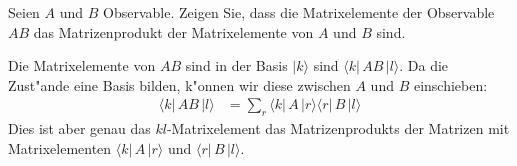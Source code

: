 Seien $A$ und $B$ Observable.
Zeigen Sie, dass die Matrixelemente der Observable $AB$ 
das Matrizenprodukt der Matrixelemente von $A$ und $B$ sind.

\begin{loesung}
Die Matrixelemente von $AB$ sind in der Basis $|k\rangle$
sind $\langle k|\,AB\,|l\rangle$.
Da die Zust"ande eine Basis bilden, k"onnen wir diese zwischen
$A$ und $B$ einschieben:
\begin{align*}
\langle k|\,AB\,|l\rangle
&=
\sum_{r}
\langle k|\,A\,|r\rangle\langle r|\,B\,|l\rangle
\end{align*}
Dies ist aber genau das $kl$-Matrixelement das Matrizenprodukts
der Matrizen mit Matrixelementen
$\langle k|\,A\,|r\rangle$
und
$\langle r|\,B\,|l\rangle$.
\end{loesung}

